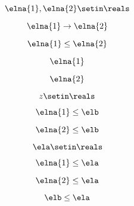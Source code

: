 {\begin{forslides}
        \begin{equation}
            \label{eq:feedback-131}
            \elna{1},\elna{2}\setin \reals
        \end{equation}

        \begin{equation}
            \label{eq:feedback-132}
            \elna{1}\to \elna{2}
        \end{equation}

        \begin{equation}
            \label{eq:feedback-133}
            \elna{1}\leq \elna{2}
        \end{equation}

        \begin{equation}
            \label{eq:feedback-134}
            \elna{1}
        \end{equation}

        \begin{equation}
            \label{eq:feedback-135}
            \elna{2}
        \end{equation}

        \begin{equation}
            \label{eq:feedback-136}
            z\setin \reals
        \end{equation}

        \begin{equation}
            \label{eq:feedback-137}
            \elna{1}\leq \elb
        \end{equation}

        \begin{equation}
            \label{eq:feedback-138}
            \elna{2}\leq \elb
        \end{equation}

        \begin{equation}
            \label{eq:feedback-139}
            \ela\setin \reals
        \end{equation}

        \begin{equation}
            \label{eq:feedback-140}
            \elna{1}\leq \ela
        \end{equation}

        \begin{equation}
            \label{eq:feedback-141}
            \elna{2}\leq \ela
        \end{equation}

        \begin{equation}
            \label{eq:feedback-142}
            \elb\leq \ela
        \end{equation}


\end{forslides}}
